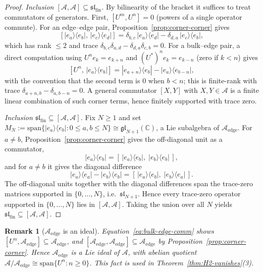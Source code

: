 \documentclass[10pt]{amsart}
\newcommand{\1}{{\mathbb{I}}}
\newtheorem{remark}[theorem]{Remark}
\numberwithin{equation}{section}
\begin{document}
\begin{proof}
\emph{Inclusion $[\mathcal{A},\mathcal{A}] \subseteq \mathfrak{sl}_{\mathrm{fin}}$.}
By bilinearity of the bracket it suffices to treat commutators of generators. First,
$[U^m,U^n]=0$ (powers of a single operator commute). For an edge--edge pair,
Proposition~\ref{prop:corner-corner} gives
\[
[|e_a\rangle\langle e_b|,\,|e_c\rangle\langle e_d|]
= \delta_{b,c}\,|e_a\rangle\langle e_d| - \delta_{d,a}\,|e_c\rangle\langle e_b|,
\]
which has rank $\le 2$ and trace $\delta_{b,c}\delta_{a,d} - \delta_{d,a}\delta_{c,b} = 0$.
For a bulk--edge pair, a direct computation using $U^n e_k = e_{k+n}$ and
$(U^*)^n e_k = e_{k-n}$ (zero if $k<n$) gives
\begin{equation}\label{eq:bulk-edge-comm}
[U^n,\,|e_a\rangle\langle e_b|]
= |e_{a+n}\rangle\langle e_b| - |e_a\rangle\langle e_{b-n}|,
\end{equation}
with the convention that the second term is $0$ when $b<n$; this is finite-rank with trace
$\delta_{a+n,b}-\delta_{a,b-n} = 0$. A general commutator $[X,Y]$ with $X,Y\in\mathcal{A}$ is a
finite linear combination of such corner terms, hence finitely supported with trace zero.

\emph{Inclusion $\mathfrak{sl}_{\mathrm{fin}} \subseteq [\mathcal{A},\mathcal{A}]$.}
Fix $N\ge 1$ and set $M_N := \mathrm{span}\{|e_a\rangle\langle e_b| : 0 \le a,b \le N\}
\cong \mathfrak{gl}_{N+1}(\mathbb{C})$, a Lie subalgebra of $\mathcal{A}_{\mathrm{edge}}$. For
$a\ne b$, Proposition~\ref{prop:corner-corner} gives the off-diagonal unit as a commutator,
\[
|e_a\rangle\langle e_b| = [\,|e_a\rangle\langle e_b|,\;|e_b\rangle\langle e_b|\,],
\]
and for $a\ne b$ it gives the diagonal difference
\[
|e_a\rangle\langle e_a| - |e_b\rangle\langle e_b|
= [\,|e_a\rangle\langle e_b|,\;|e_b\rangle\langle e_a|\,].
\]
The off-diagonal units together with the diagonal differences span the trace-zero matrices
supported in $\{0,\dots,N\}$, i.e.\ $\mathfrak{sl}_{N+1}$. Hence every trace-zero operator
supported in $\{0,\dots,N\}$ lies in $[\mathcal{A},\mathcal{A}]$. Taking the union over all $N$
yields $\mathfrak{sl}_{\mathrm{fin}} \subseteq [\mathcal{A},\mathcal{A}]$.
\end{proof}

\begin{remark}[$\mathcal{A}_{\mathrm{edge}}$ is an ideal]\label{rem:edge-ideal}
Equation~\eqref{eq:bulk-edge-comm} shows $[U^n,\mathcal{A}_{\mathrm{edge}}]\subseteq
\mathcal{A}_{\mathrm{edge}}$, and $[\mathcal{A}_{\mathrm{edge}},\mathcal{A}_{\mathrm{edge}}]
\subseteq\mathcal{A}_{\mathrm{edge}}$ by Proposition~\ref{prop:corner-corner}. Hence
$\mathcal{A}_{\mathrm{edge}}$ is a Lie ideal of $\mathcal{A}$, with abelian quotient
$\mathcal{A}/\mathcal{A}_{\mathrm{edge}}\cong\mathrm{span}\{U^n:n\ge0\}$. This fact is used in
Theorem~\ref{thm:H2-vanishes}(3).
\end{remark}
\end{document}
